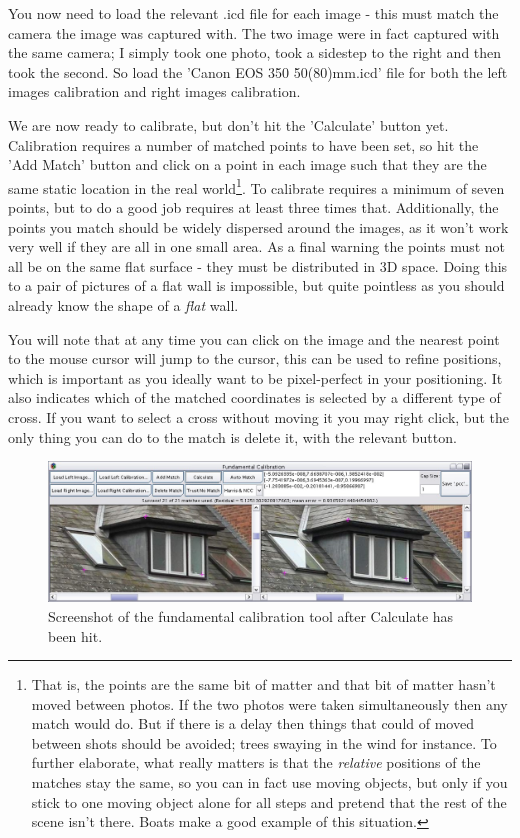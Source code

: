 \documentclass[10pt,a4paper,twoside]{article}
\begin{document}
You now need to load the relevant .icd file for each image - this must match the camera the image was captured with. The two image were in fact captured with the same camera; I simply took one photo, took a sidestep to the right and then took the second. So load the 'Canon EOS 350 50(80)mm.icd' file for both the left images calibration and right images calibration.

We are now ready to calibrate, but don't hit the 'Calculate' button yet. Calibration requires a number of matched points to have been set, so hit the 'Add Match' button and click on a point in each image such that they are the same static location in the real world\footnote{That is, the points are the same bit of matter and that bit of matter hasn't moved between photos. If the two photos were taken simultaneously then any match would do. But if there is a delay then things that could of moved between shots should be avoided; trees swaying in the wind for instance. To further elaborate, what really matters is that the \emph{relative} positions of the matches stay the same, so you can in fact use moving objects, but only if you stick to one moving object alone for all steps and pretend that the rest of the scene isn't there. Boats make a good example of this situation.}. To calibrate requires a minimum of seven points, but to do a good job requires at least three times that. Additionally, the points you match should be widely dispersed around the images, as it won't work very well if they are all in one small area. As a final warning the points must not all be on the same flat surface - they must be distributed in 3D space. Doing this to a pair of pictures of a flat wall is impossible, but quite pointless as you should already know the shape of a \emph{flat} wall.

You will note that at any time you can click on the image and the nearest point to the mouse cursor will jump to the cursor, this can be used to refine positions, which is important as you ideally want to be pixel-perfect in your positioning. It also indicates which of the matched coordinates is selected by a different type of cross. If you want to select a cross without moving it you may right click, but the only thing you can do to the match is delete it, with the relevant button.

\begin{figure}
 \centering
 \includegraphics[width=1.0\textwidth]{screenshots/fundamental_manual.jpg}
 \caption{Screenshot of the fundamental calibration tool after Calculate has been hit.}
 \label{fig:fundamental_manual}
\end{figure}
\end{document}
